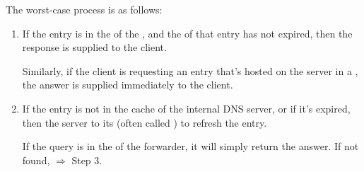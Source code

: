\documentclass[dvipsnames]{article}
\begin{document}
The worst-case process is as follows:

\newcommand{\goTo}[1]{$\Rightarrow $ Step #1}
\begin{enumerate}
\item If the entry is in the  of the ,
  and the  of that entry has not expired, then the
  response is supplied to the client.

  Similarly, if the client is requesting an entry that's hosted on the server in
  a , the answer is supplied immediately to the client.
\item If the entry is not in the cache of the internal DNS server, or if it's
  expired, then the server  to its  (often called ) to refresh the entry.

  If the query is in the  of the forwarder, it will simply return the
  answer. If not found, \goTo{3}.


\end{enumerate}
\end{document}
